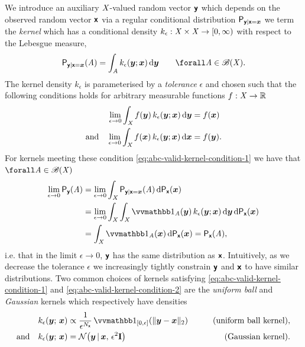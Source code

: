 We introduce an auxiliary $\mathit{X}$-valued random vector $\boldsymbol{\mathsf{y}}$ which depends on the observed random vector $\boldsymbol{\mathsf{x}}$ via a regular conditional distribution $\mathsf{P}_{\boldsymbol{\mathsf{y}}|\boldsymbol{\mathsf{x}}=\boldsymbol{x}}$ we term the \emph{kernel} which has a conditional density $k_\epsilon : \mathit{X} \times \mathit{X} \to [0, \infty)$ with respect to the Lebesgue measure,
\begin{equation}\label{eq:abc-kernel}
  \prob{\rvct{y}|\rvct{x}=\vct{x}}\lpa \set{A} \rpa = 
  \int_{\set{A}} k_{\epsilon}(\vct{y}; \vct{x}) \,\dr\vct{y}
  \qquad \forall \set{A} \in \borel(\set{X}).
\end{equation}
The kernel density $k_\epsilon$ is parameterised by a \emph{tolerance} $\epsilon$ and chosen such that the following conditions holds for arbitrary measurable functions $f : \mathit{X} \to \mathbb{R}$
\begin{align}
  \label{eq:abc-valid-kernel-condition-1}
  \lim_{\epsilon \to 0} \int_{\mathit{X}} f(\boldsymbol{y}) \, k_{\epsilon}(\boldsymbol{y}; \boldsymbol{x}) \,\mathrm{d}\boldsymbol{y}
  &= f(\boldsymbol{x})\\
  \label{eq:abc-valid-kernel-condition-2}
  \textrm{and}\quad
  \lim_{\epsilon \to 0} \int_{\mathit{X}} f(\boldsymbol{x}) \, k_{\epsilon}(\boldsymbol{y}; \boldsymbol{x}) \,\mathrm{d}\boldsymbol{x}
  &= f(\boldsymbol{y}).
\end{align}
For kernels meeting these condition \eqref{eq:abc-valid-kernel-condition-1} we have that $\forall \set{A} \in \borel(\set{X})$
\begin{align}
  \lim_{\epsilon \to 0 } \prob{\rvct{y}}(\set{A}) &=
  \lim_{\epsilon \to 0} 
  \int_{\set{X}}
    \prob{\rvct{y}|\rvct{x}=\vct{x}}\lpa \set{A} \rpa
  \,\dr\prob{\rvct{x}}(\vct{x})\\
  &=
  \lim_{\epsilon \to 0 } 
  \int_{\set{X}} \int_{\set{X}} 
    \ind{\set{A}}(\vct{y}) \, k_{\epsilon}(\vct{y}; \vct{x}) 
  \,\dr\vct{y} \,\dr\prob{\rvct{x}}(\vct{x})\\
  &=
  \int_{\set{X}} \ind{\set{A}}(\vct{x}) \,\dr\prob{\rvct{x}}(\vct{x}) =
  \prob{\rvct{x}}(\set{A}),
\end{align}
i.e. that in the limit $\epsilon \to 0$, $\boldsymbol{\mathsf{y}}$ has the same distribution as $\boldsymbol{\mathsf{x}}$. Intuitively, as we decrease the tolerance $\epsilon$ we increasingly tightly constrain $\boldsymbol{\mathsf{y}}$ and $\boldsymbol{\mathsf{x}}$ to have similar distributions. Two common choices of kernels satisfying \eqref{eq:abc-valid-kernel-condition-1} and \eqref{eq:abc-valid-kernel-condition-2} are the \emph{uniform ball} and \emph{Gaussian} kernels which respectively have densities
\begin{align}
\label{eq:uniform-ball-abc-kernel}
  k_\epsilon(\vct{y};\,\vct{x}) &\propto 
  \frac{1}{\epsilon^{N_{\rvct{x}}}} 
  \ind{[0,\epsilon]}\lpa\Vert\vct{y} - \vct{x}\Vert_2\rpa & 
  \qquad \textrm{(uniform ball kernel)},\\
\label{eq:gaussian-abc-kernel}
  \textrm{and}\quad
  k_\epsilon(\vct{y};\,\vct{x}) &= 
  \nrm{\vct{y}\gvn\vct{x},\,\epsilon^2\mathbf{I}} &
  \qquad \textrm{(Gaussian kernel)}. 
\end{align}
